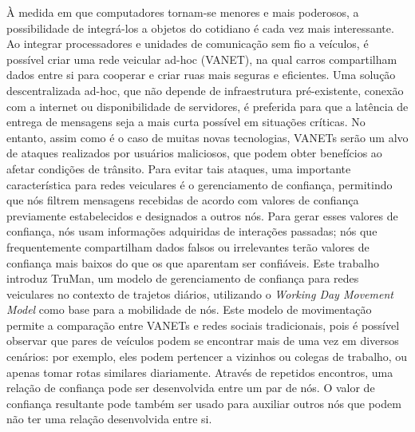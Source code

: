 \begin{resumo}



À medida em que computadores tornam-se menores e mais poderosos, a possibilidade de integrá-los a objetos do cotidiano é cada vez mais interessante.
Ao integrar processadores e unidades de comunicação sem fio a veículos, é possível criar uma rede veicular ad-hoc (VANET), na qual carros compartilham dados entre si para cooperar e criar ruas mais seguras e eficientes.
Uma solução descentralizada ad-hoc, que não depende de infraestrutura pré-existente, conexão com a internet ou disponibilidade de servidores, é preferida para que a latência de entrega de mensagens seja a mais curta possível em situações críticas.
No entanto, assim como é o caso de muitas novas tecnologias, VANETs serão um alvo de ataques realizados por usuários maliciosos, que podem obter benefícios ao afetar condições de trânsito.
Para evitar tais ataques, uma importante característica para redes veiculares é o gerenciamento de confiança, permitindo que nós filtrem mensagens recebidas de acordo com valores de confiança previamente estabelecidos e designados a outros nós.
Para gerar esses valores de confiança, nós usam informações adquiridas de interações passadas; nós que frequentemente compartilham dados falsos ou irrelevantes terão valores de confiança mais baixos do que os que aparentam ser confiáveis.
Este trabalho introduz TruMan, um modelo de gerenciamento de confiança para redes veiculares no contexto de trajetos diários, utilizando o \textit{Working Day Movement Model} como base para a mobilidade de nós.
Este modelo de movimentação permite a comparação entre VANETs e redes sociais tradicionais, pois é possível observar que pares de veículos podem se encontrar mais de uma vez em diversos cenários: por exemplo, eles podem pertencer a vizinhos ou colegas de trabalho, ou apenas tomar rotas similares diariamente.
Através de repetidos encontros, uma relação de confiança pode ser desenvolvida entre um par de nós.
O valor de confiança resultante pode também ser usado para auxiliar outros nós que podem não ter uma relação desenvolvida entre si.

\end{resumo}
